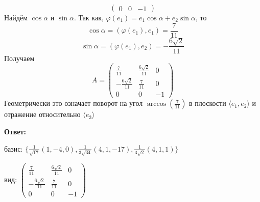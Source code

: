 \documentclass[a4paper]{article}
\renewcommand{\f}[2]{\frac{#1}{#2}}
\renewcommand{\phi}{\varphi}
\begin{document}
\begin{enumerate}
$$\begin{pmatrix}
    0 & 0 & -1
    \end{pmatrix}$$
    Найдём $\cos \alpha$ и $\sin \alpha$. Так как, $\phi(e_1) = e_1\cos \alpha  + e_2\sin \alpha$, то
    $$\cos \alpha = (\phi(e_1), e_1) = \f{7}{11}$$
    $$\sin \alpha = (\phi(e_1), e_2) = -\f{6\sqrt{2}}{11}$$
    Получаем
    $$A=\begin{pmatrix}
    \f{7}{11} & \f{6\sqrt{2}}{11} & 0\\
    -\f{6\sqrt{2}}{11} & \f{7}{11} & 0\\
    0 & 0 & -1
    \end{pmatrix}$$
    Геометрически это означает поворот на угол $\arccos(\f{7}{11})$ в плоскости $\langle e_1, e_2 \rangle$ и отражение относительно $\langle e_3 \rangle$
    
    \textbf{Ответ:} 
    
    базис: $\{\frac1{\sqrt{17}}(1,-4,0), \frac1{3\sqrt{34}}(4,1,-17), \f{1}{3\sqrt{2}}(4, 1, 1)\}$ 
    
    вид: $\begin{pmatrix}
    \f{7}{11} & \f{6\sqrt{2}}{11} & 0\\
    -\f{6\sqrt{2}}{11} & \f{7}{11} & 0\\
    0 & 0 & -1
    \end{pmatrix}$
\end{enumerate}
\end{document}
